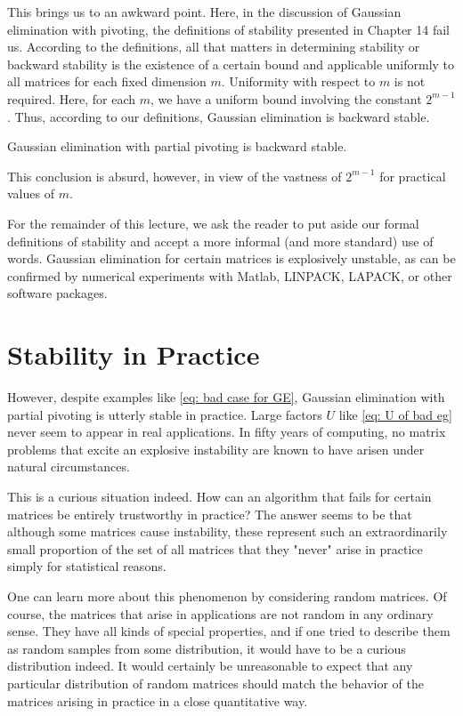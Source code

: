 This brings us to an awkward point. Here, in the discussion of Gaussian elimination with pivoting, the definitions of stability presented in Chapter 14 fail us. According to the definitions, all that matters in determining stability or backward stability is the existence of a certain bound and applicable uniformly to all matrices for each fixed dimension $m$. Uniformity with respect to $m$ is not required. Here, for each $m$, we have a uniform bound involving the constant $2^{m-1}$. Thus, according to our definitions, Gaussian elimination is backward stable. 


\begin{theorem}
\label{thm: Backstap of GE with partial pivoting}
Gaussian elimination with partial pivoting is backward stable. 
\end{theorem}

This conclusion is absurd, however, in view of the vastness of $2^{m-1}$ for practical values of $m$. 

For the remainder of this lecture, we ask the reader to put aside our formal definitions of stability and accept a more informal (and more standard) use of words. Gaussian elimination for  certain matrices is explosively unstable, as can be confirmed by numerical experiments with Matlab, LINPACK, LAPACK, or other software packages.  

\section{Stability in Practice}
However, despite examples like \eqref{eq: bad case for GE}, Gaussian elimination with partial pivoting is utterly stable in practice. Large factors $U$ like \eqref{eq: U of bad eg} never seem to appear in real applications. In fifty years of computing, no matrix problems that excite an explosive instability are known to have arisen under natural circumstances. 

This is a curious situation indeed. How can an algorithm that fails for certain matrices be entirely trustworthy in practice? The answer seems to be that although some matrices cause instability, these represent such an extraordinarily small proportion of the set of all matrices that they "never" arise in practice simply for statistical reasons.

One can learn more about this phenomenon by considering random matrices. Of course, the matrices that arise in applications are not random in any ordinary sense. They have all kinds of special properties, and if one tried to describe them as random samples from some distribution, it would have to be a curious distribution indeed. It would certainly be unreasonable to expect that any particular distribution of random matrices should match the behavior of the matrices arising in practice in a close quantitative way.

